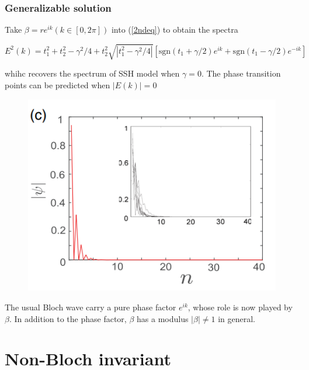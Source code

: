 \documentclass{beamer}
\begin{document}
\begin{frame}
\frametitle{Generalizable solution}
Take $\beta=re^{ik}(k\in\left[0,2\pi\right])$ into (\ref{2ndeq}) to obtain the spectra
\begin{scriptsize}
\begin{equation}
E^2(k)=t_1^2+t_2^2-\gamma^2/4+t_2^2\sqrt{|t_1^2-\gamma^2/4|}\left[\text{sgn}(t_1+\gamma/2)e^{ik}+\text{sgn}(t_1-\gamma/2)e^{-ik}\right]
\end{equation}
\end{scriptsize}
whihc recovers the spectrum of SSH model when $\gamma=0$. The phase transition points can be predicted when $|E(k)|=0$
\begin{figure}[f]
\includegraphics[scale=0.5]{figure/NSEF.png}
\end{figure}
The usual Bloch wave carry a pure phase factor $e^{ik}$, whose role is now played by $\beta$. In addition to the phase factor, $\beta$ has a modulus $|\beta|\neq 1$ in general.
\end{frame}
  
  \section{Non-Bloch invariant}
\end{document}
